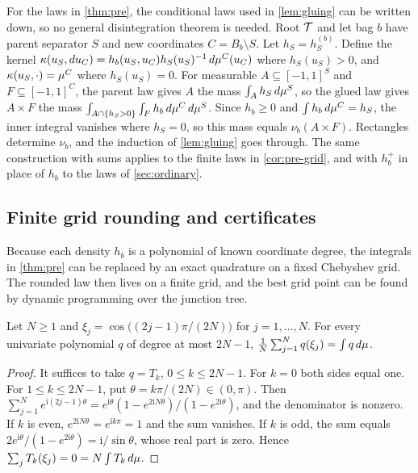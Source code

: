 \begin{remark}\label{rem:ker-gluing}
For the laws in \cref{thm:pre}, the conditional laws used in
\cref{lem:gluing} can be written down, so no general disintegration theorem
is needed. Root $\mathcal{T}$ and let bag $b$ have parent separator $S$ and new
coordinates $C=B_b\setminus S$. Let $h_S=h^{(b)}_S$. Define the kernel
$\kappa(u_S,du_C)=h_b(u_S,u_C)h_S(u_S)^{-1}\,d\mu^C(u_C)$ where
$h_S(u_S)>0$, and $\kappa(u_S,\cdot)=\mu^C$ where $h_S(u_S)=0$. For
measurable $A\subseteq[-1,1]^S$ and $F\subseteq[-1,1]^C$, the parent law
gives $A$ the mass $\int_Ah_S\,d\mu^S$, so the glued law gives $A\times F$
the mass $\int_{A\cap\{h_S>0\}}\int_Fh_b\,d\mu^C\,d\mu^S$. Since
$h_b\ge0$ and $\int h_b\,d\mu^C=h_S$, the inner integral vanishes where
$h_S=0$, so this mass equals $\nu_b(A\times F)$. Rectangles determine
$\nu_b$, and the induction of \cref{lem:gluing} goes through. The same
construction with sums applies to the finite laws in \cref{cor:pre-grid},
and with $h_b^+$ in place of $h_b$ to the laws of \cref{sec:ordinary}.
\end{remark}

\subsection{Finite grid rounding and certificates}\label{sec:ker-grid}

Because each density $h_b$ is a polynomial of known coordinate degree, the
integrals in \cref{thm:pre} can be replaced by an exact quadrature on a
fixed Chebyshev grid. The rounded law then lives on a finite grid, and the
best grid point can be found by dynamic programming over the junction tree.

\begin{lemma}\label{lem:ker-quadrature}
Let $N\ge1$ and $\xi_j=\cos\bigl((2j-1)\pi/(2N)\bigr)$ for
$j=1,\dots,N$. For every univariate polynomial $q$ of degree at most $2N-1$,
$\frac1N\sum_{j=1}^Nq(\xi_j)=\int q\,d\mu$.
\end{lemma}

\begin{proof}
It suffices to take $q=T_k$, $0\le k\le2N-1$. For $k=0$ both sides equal
one. For $1\le k\le2N-1$, put $\theta=k\pi/(2N)\in(0,\pi)$. Then
$\sum_{j=1}^Ne^{\mathrm{i}(2j-1)\theta}=e^{\mathrm{i}\theta}
(1-e^{2\mathrm{i}N\theta})/(1-e^{2\mathrm{i}\theta})$, and the denominator
is nonzero. If $k$ is even, $e^{2\mathrm{i}N\theta}=e^{\mathrm{i}k\pi}=1$
and the sum vanishes. If $k$ is odd, the sum equals
$2e^{\mathrm{i}\theta}/(1-e^{2\mathrm{i}\theta})=\mathrm{i}/\sin\theta$,
whose real part is zero. Hence $\sum_jT_k(\xi_j)=0=N\int T_k\,d\mu$.
\end{proof}

